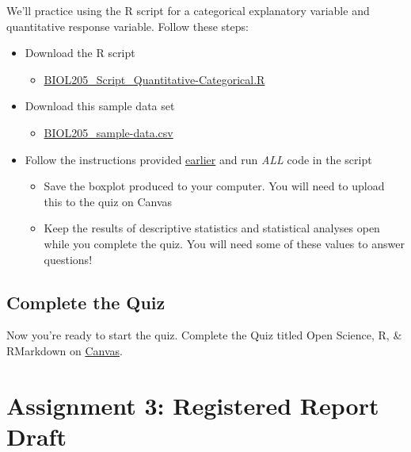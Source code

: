 \documentclass[
]{book}
\providecommand{\tightlist}{%
  \setlength{\itemsep}{0pt}\setlength{\parskip}{0pt}}
\begin{document}
We'll practice using the R script for a categorical explanatory variable and quantitative response variable. Follow these steps:

\begin{itemize}
\tightlist
\item
  Download the R script

  \begin{itemize}
  \tightlist
  \item
    \href{https://osf.io/download/46mpk}{BIOL205\_Script\_Quantitative-Categorical.R}
  \end{itemize}
\item
  Download this sample data set

  \begin{itemize}
  \tightlist
  \item
    \href{https://osf.io/download/3r76k}{BIOL205\_sample-data.csv}
  \end{itemize}
\item
  Follow the instructions provided \href{https://ubco-biology.github.io/BIOL-205-Lab-Manual/using-the-rscripts.html}{earlier} and run \emph{ALL} code in the script

  \begin{itemize}
  \tightlist
  \item
    Save the boxplot produced to your computer. You will need to upload this to the quiz on Canvas
  \item
    Keep the results of descriptive statistics and statistical analyses open while you complete the quiz. You will need some of these values to answer questions!
  \end{itemize}
\end{itemize}

\hypertarget{complete-the-quiz}{%
\section*{Complete the Quiz}\label{complete-the-quiz}}

Now you're ready to start the quiz. Complete the Quiz titled Open Science, R, \& RMarkdown on \href{https://canvas.ubc.ca/courses/98621}{Canvas}.

\hypertarget{assignment-3-registered-report-draft}{%
\chapter*{Assignment 3: Registered Report Draft}\label{assignment-3-registered-report-draft}}
\end{document}

